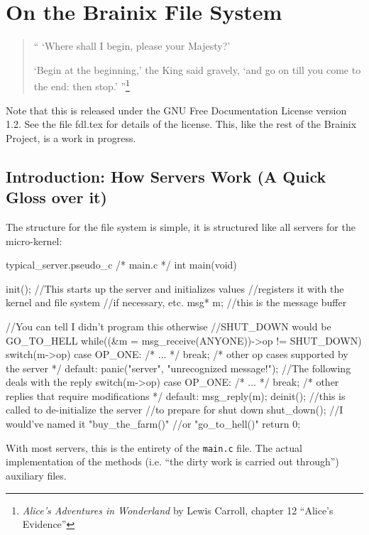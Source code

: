 \chapter{On the Brainix File System}
\begin{quote}
 `` `Where shall I begin, please your Majesty?' 

\indent `Begin at the beginning,' the King said gravely, `and go on till you come to the end: then stop.' ''\footnote{\textit{Alice's Adventures in Wonderland} by Lewis Carroll, chapter 12 ``Alice's Evidence''}
\end{quote}

Note that this is released under the GNU Free Documentation License version 1.2. See the file fdl.tex for details of the license. This, like the rest of the Brainix Project, is a work in progress.\
\section{Introduction: How Servers Work (A Quick Gloss over it)}
The structure for the file system is simple, it is structured like all servers for the micro-kernel:
\begin{code}{typical\_server.pseudo\_c}
 /* main.c */
int main(void) {
     init(); //This starts up the server and initializes values
             //registers it with the kernel and file system
             //if necessary, etc.
     msg* m; //this is the message buffer

     //You can tell I didn't program this otherwise 
     //SHUT_DOWN would be GO_TO_HELL
     while((&m = msg_receive(ANYONE))->op != SHUT_DOWN) 
     {
          switch(m->op) {
               case OP_ONE: /* ... */ break;
               /* other op cases supported by the server */
               default: panic("server", "unrecognized message!");
          }
          //The following deals with the reply
          switch(m->op)
          {
               case OP_ONE: /* ... */ break;
               /* other replies that require modifications */
               default: msg_reply(m);
          }
     }
     deinit(); //this is called to de-initialize the server
               //to prepare for shut down
     shut_down(); //I would've named it "buy_the_farm()"
                  //or "go_to_hell()"
     return 0;
}
\end{code}
With most servers, this is the entirety of the \verb|main.c| file. The actual implementation of the methods (i.e. ``the dirty work is carried out through'') auxiliary files.

